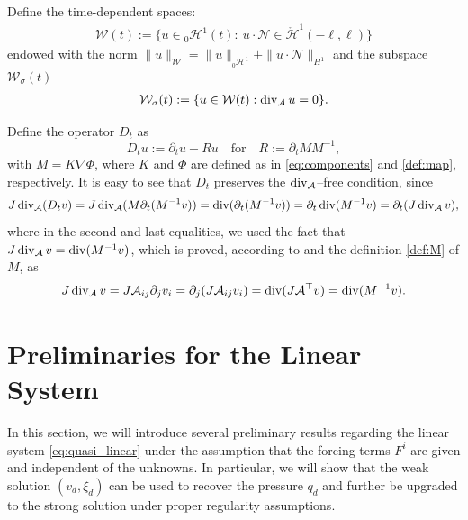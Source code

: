 \documentclass[letterpaper,reqno,10pt,twoside]{amsart}
\theoremstyle{definition}
\theoremstyle{remark}
\def\p{\partial}
\def\dive{\mathop{\rm div}\nolimits}
\begin{document}
	Define the time-dependent spaces:
	\begin{align}\label{def:w}
		\mathcal{W}(t):=\{u\in{}_0\mathcal{H}^1(t): \ u\cdot\mathcal{N}\in \mathring{\mathcal{H}}^1(-\ell, \ell)\}
	\end{align}
	endowed with the norm $\|u\|_{\mathcal{W}}=\|u\|_{{}_{0}\mathcal{H}^{1}}+\|u\cdot \mathcal{N}\|_{H^{1}}$ and the subspace $\mathcal{W}_\sigma(t)$
	\begin{align}\label{def:w-sigma}
		\mathcal{W}_\sigma(t):=\{u\in \mathcal{W}(t): \dive_{\mathcal{A}}u=0\}.
	\end{align}
	
	Define the operator $D_t$ as
	\begin{equation}\label{def:Dt_u}
		D_tu:=\p_tu-Ru\quad\text{for}\quad R:=\p_tMM^{-1},
	\end{equation}
	with $M=K\nabla\Phi$, where $K$ and $\Phi$ are defined as in \eqref{eq:components} and \eqref{def:map}, respectively. It is easy to see that $D_t$ preserves the $\dive_{\mathcal{A}}$--free condition, since
	\begin{equation}\label{eq:dive_dt}
		J\dive_{\mathcal{A}}(D_tv)=J\dive_{\mathcal{A}}(M\p_t(M^{-1}v))=\dive(\p_t(M^{-1}v))=\p_t\dive(M^{-1}v)=\p_t(J\dive_{\mathcal{A}}v),
	\end{equation}
	where in the second and last equalities, we used the fact that $J\dive_{\mathcal{A}}v=\dive(M^{-1}v)$, which is proved, according to \cite[Lemma A]{ZhT17} and the definition \eqref{def:M} of $M$, as
	\begin{equation}\label{eq:div-a-div}
		J\dive_{\mathcal{A}}v=J\mathcal{A}_{ij}\p_jv_i=\p_j(J\mathcal{A}_{ij}v_i)=\dive(J\mathcal{A}^\top v)=\dive(M^{-1}v).
	\end{equation}
	
	
	\section{Preliminaries for the Linear System}\label{sec:linear}
	
	
	In this section, we will introduce several preliminary results regarding the linear system \eqref{eq:quasi_linear} under the assumption that the forcing terms $F^i$ are given and independent of the unknowns. In particular, we will show that the weak solution $(v_d,\xi_d)$ can be used to recover the pressure $q_d$ and further be upgraded to the strong solution under proper regularity assumptions. 
	
\end{document}
